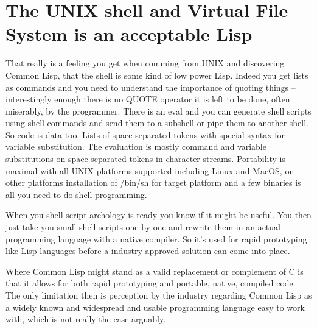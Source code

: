 \documentclass[sigconf]{acmart}
\begin{document}
   




\maketitle


\section{The UNIX shell and Virtual File System is an acceptable Lisp}

That really is a feeling you get when comming from UNIX and discovering
Common Lisp, that the shell is some kind of low power Lisp. Indeed you
get lists as commands and you need to understand the importance of
quoting things -- interestingly enough there is no QUOTE operator it
is left to be done, often miserably, by the programmer. There is an eval
and you can generate shell scripts using shell commands and send them
to a subshell or pipe them to another shell. So code is data too.
Lists of space separated tokens with special syntax for variable
substitution. The evaluation is mostly command and variable
substitutions on space separated tokens in character streams.
Portability is maximal with all UNIX platforms supported including
Linux and MacOS, on other platforms installation of /bin/sh for
target platform and a few binaries is all you need to do shell
programming.

When you shell script archology is ready you know if it might be useful.
You then just take you small shell scripts one by one and rewrite
them in an actual programming language with a native compiler. So it's
used for rapid prototyping like Lisp languages before a industry
approved solution can come into place.

Where Common Lisp might stand as a valid replacement or complement of
C is that it allows for both rapid prototyping and portable, native,
compiled code. The only limitation then is perception by the industry
regarding Common Lisp as a widely known and widespread and usable
programming language easy to work with, which is not really the case
arguably.
\end{document}
